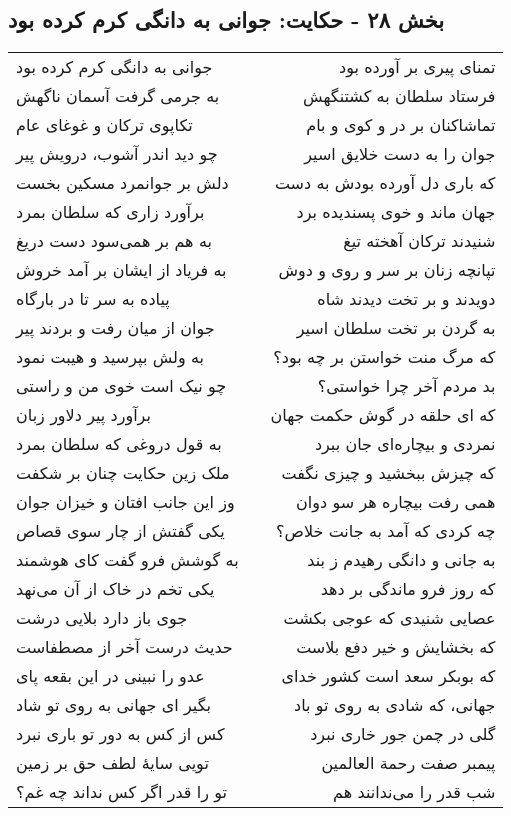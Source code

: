 \begin{center}
\section*{بخش ۲۸ - حکایت: جوانی به دانگی کرم کرده بود}
\label{sec:028}
\begin{longtable}{l p{0.5cm} r}
جوانی به دانگی کرم کرده بود
&&
تمنای پیری بر آورده بود
\\
به جرمی گرفت آسمان ناگهش
&&
فرستاد سلطان به کشتنگهش
\\
تکاپوی ترکان و غوغای عام
&&
تماشاکنان بر در و کوی و بام
\\
چو دید اندر آشوب، درویش پیر
&&
جوان را به دست خلایق اسیر
\\
دلش بر جوانمرد مسکین بخست
&&
که باری دل آورده بودش به دست
\\
برآورد زاری که سلطان بمرد
&&
جهان ماند و خوی پسندیده برد
\\
به هم بر همی‌سود دست دریغ
&&
شنیدند ترکان آهخته تیغ
\\
به فریاد از ایشان بر آمد خروش
&&
تپانچه زنان بر سر و روی و دوش
\\
پیاده به سر تا در بارگاه
&&
دویدند و بر تخت دیدند شاه
\\
جوان از میان رفت و بردند پیر
&&
به گردن بر تخت سلطان اسیر
\\
به ولش بپرسید و هیبت نمود
&&
که مرگ منت خواستن بر چه بود؟
\\
چو نیک است خوی من و راستی
&&
بد مردم آخر چرا خواستی؟
\\
برآورد پیر دلاور زبان
&&
که ای حلقه در گوش حکمت جهان
\\
به قول دروغی که سلطان بمرد
&&
نمردی و بیچاره‌ای جان ببرد
\\
ملک زین حکایت چنان بر شکفت
&&
که چیزش ببخشید و چیزی نگفت
\\
وز این جانب افتان و خیزان جوان
&&
همی رفت بیچاره هر سو دوان
\\
یکی گفتش از چار سوی قصاص
&&
چه کردی که آمد به جانت خلاص؟
\\
به گوشش فرو گفت کای هوشمند
&&
به جانی و دانگی رهیدم ز بند
\\
یکی تخم در خاک از آن می‌نهد
&&
که روز فرو ماندگی بر دهد
\\
جوی باز دارد بلایی درشت
&&
عصایی شنیدی که عوجی بکشت
\\
حدیث درست آخر از مصطفاست
&&
که بخشایش و خیر دفع بلاست
\\
عدو را نبینی در این بقعه پای
&&
که بوبکر سعد است کشور خدای
\\
بگیر ای جهانی به روی تو شاد
&&
جهانی، که شادی به روی تو باد
\\
کس از کس به دور تو باری نبرد
&&
گلی در چمن جور خاری نبرد
\\
تویی سایهٔ لطف حق بر زمین
&&
پیمبر صفت رحمة ‌العالمین
\\
تو را قدر اگر کس نداند چه غم؟
&&
شب قدر را می‌ندانند هم
\\
\end{longtable}
\end{center}
